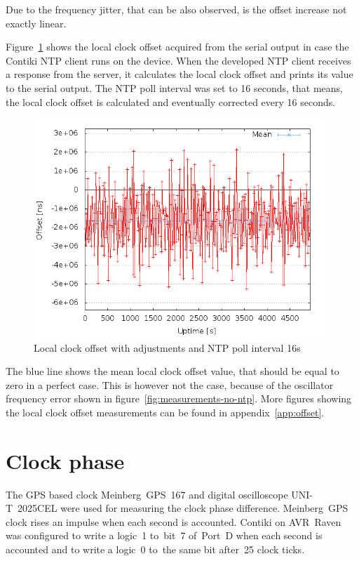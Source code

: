 Due to the frequency jitter, that can be also observed,
is the offset increase not exactly linear.

Figure~\ref{fig:measurements-ntp-serial} shows the local clock offset
acquired from the serial output in case the Contiki NTP client runs on the device.
When the developed NTP client receives a response from the server,
it calculates the local clock offset and prints its value to the serial output.
The NTP poll interval was set to 16 seconds, that means, the local clock offset
is calculated and eventually corrected every 16 seconds.
\begin{figure}[H]
  \centering
  \includegraphics[width=11cm,keepaspectratio]{fig/poll-16s.png}
  \caption{Local clock offset with adjustments and NTP poll interval 16s}
  \label{fig:measurements-ntp-serial}
\end{figure}
The blue line shows the mean local clock offset value,
that should be equal to zero in a perfect case.
This is however not the case, because of the oscillator frequency error
shown in figure~\ref{fig:measurements-no-ntp}.
More figures showing the local clock offset measurements
can be found in appendix~\ref{app:offset}.

\section{Clock phase}
The GPS based clock Meinberg~GPS~167 and digital oscilloscope UNI-T~2025CEL
were used for measuring the clock phase difference.
Meinberg~GPS clock rises an impulse when each second is accounted.
Contiki on AVR~Raven was configured to write a logic~1
to~bit~7 of~Port~D when each second is accounted
and to write a logic~0 to~the same bit after~25 clock ticks.

